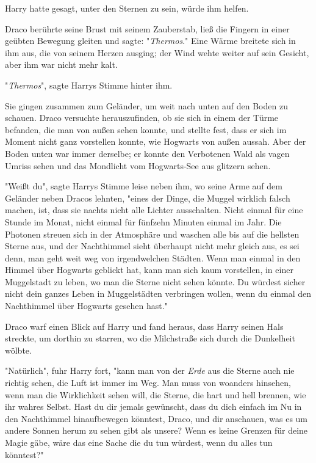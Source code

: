 {Harry hatte gesagt, unter den Sternen zu sein, würde ihm helfen.

Draco berührte seine Brust mit seinem Zauberstab, ließ die Fingern in einer geübten Bewegung gleiten und sagte: "\emph{Thermos}." Eine Wärme breitete sich in ihm aus, die von seinem Herzen ausging; der Wind wehte weiter auf sein Gesicht, aber ihm war nicht mehr kalt.

"\emph{Thermos}", sagte Harrys Stimme hinter ihm.

Sie gingen zusammen zum Geländer, um weit nach unten auf den Boden zu schauen. Draco versuchte herauszufinden, ob sie sich in einem der Türme befanden, die man von außen sehen konnte, und stellte fest, dass er sich im Moment nicht ganz vorstellen konnte, wie Hogwarts von außen aussah. Aber der Boden unten war immer derselbe; er konnte den Verbotenen Wald als vagen Umriss sehen und das Mondlicht vom Hogwarts-See aus glitzern sehen.

"Weißt du", sagte Harrys Stimme leise neben ihm, wo seine Arme auf dem Geländer neben Dracos lehnten, "eines der Dinge, die Muggel wirklich falsch machen, ist, dass sie nachts nicht alle Lichter ausschalten. Nicht einmal für eine Stunde im Monat, nicht einmal für fünfzehn Minuten einmal im Jahr. Die Photonen streuen sich in der Atmosphäre und waschen alle bis auf die hellsten Sterne aus, und der Nachthimmel sieht überhaupt nicht mehr gleich aus, es sei denn, man geht weit weg von irgendwelchen Städten. Wenn man einmal in den Himmel über Hogwarts geblickt hat, kann man sich kaum vorstellen, in einer Muggelstadt zu leben, wo man die Sterne nicht sehen könnte. Du würdest sicher nicht dein ganzes Leben in Muggelstädten verbringen wollen, wenn du einmal den Nachthimmel über Hogwarts gesehen hast."

Draco warf einen Blick auf Harry und fand heraus, dass Harry seinen Hals streckte, um dorthin zu starren, wo die Milchstraße sich durch die Dunkelheit wölbte.

"Natürlich", fuhr Harry fort, "kann man von der \emph{Erde} aus die Sterne auch nie richtig sehen, die Luft ist immer im Weg. Man muss von woanders hinsehen, wenn man die Wirklichkeit sehen will, die Sterne, die hart und hell brennen, wie ihr wahres Selbst. Hast du dir jemals gewünscht, dass du dich einfach im Nu in den Nachthimmel hinaufbewegen könntest, Draco, und dir anschauen, was es um andere Sonnen herum zu sehen gibt als unsere? Wenn es keine Grenzen für deine Magie gäbe, wäre das eine Sache die du tun würdest, wenn du alles tun könntest?"

}
